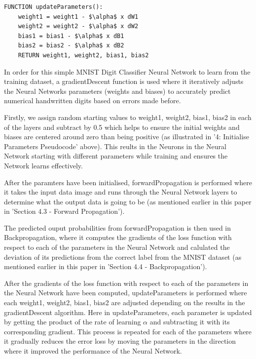 \documentclass[11pt]{article}
\begin{document}
\begin{lstlisting}[language={},mathescape=true, caption={Update Parameters Pseudocode}]
FUNCTION updateParameters():
    weight1 = weight1 - $\alpha$ x dW1
    weight2 = weight2 - $\alpha$ x dW2
    bias1 = bias1 - $\alpha$ x dB1
    bias2 = bias2 - $\alpha$ x dB2
    RETURN weight1, weight2, bias1, bias2
\end{lstlisting}


\vspace{1em}
In order for this simple MNIST Digit Classifier Neural Network to learn from the training dataset, a gradientDescent function is used where it iteratively adjusts the Neural Networks parameters (weights and biases) to accurately predict numerical handwritten digits based on errors made before.

\vspace{1em}
Firstly, we assign random starting values to weight1, weight2, bias1, bias2 in each of the layers and subtract by 0.5 which helps to ensure the initial weights and biases are centered around zero than being positive (as illustrated in '4: Initialise Parameters Pseudocode' above). This reults in the Neurons in the Neural Network starting with different parameters while training and ensures the Network learns effectively.

\vspace{1em}
After the paramters have been initialised, forwardPropagation is performed where it takes the input data image and runs through the Neural Network layers to determine what the output data is going to be (as mentioned earlier in this paper in 'Section 4.3 - Forward Propagation').

\vspace{1em}
The predicted ouput probabilities from forwardPropagation is then used in Backpropagation, where it computes the gradients of the loss function with respect to each of the parameters in the Neural Network and calulated the deviation of its predictions from the correct label from the MNIST dataset (as mentioned earlier in this paper in 'Section 4.4 - Backpropagation').

\vspace{1em}
After the gradients of the loss function with respect to each of the parameters in the Neural Network have been computed, updateParameters is performed where each weight1, weight2, bias1, bias2 are adjusted depending on the results in the gradientDescent algorithm. Here in updateParameters, each parameter is updated by getting the product of the rate of learning $\alpha$ and subtracting it with its corresponding gradient. This process is repeated for each of the parameters where it gradually reduces the error loss by moving the parameters in the direction where it improved the performance of the Neural Network.
\end{document}
